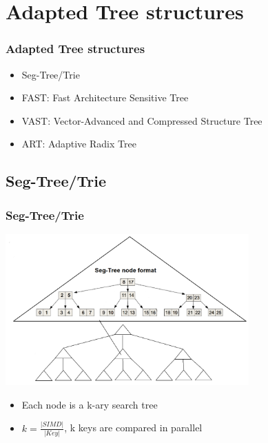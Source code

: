 \documentclass{beamer}
\begin{document}
\section{Adapted Tree structures}

\begin{frame}
\frametitle{Adapted Tree structures}
\begin{itemize}
	\item Seg-Tree/Trie
	\item FAST: Fast Architecture Sensitive Tree
	\item VAST: Vector-Advanced and Compressed Structure Tree
	\item ART: Adaptive Radix Tree
\end{itemize}
\end{frame}

\subsection{Seg-Tree/Trie}
\begin{frame}
\frametitle{Seg-Tree/Trie}
\begin{center}
	\includegraphics[width=0.7\textwidth]{img/seg_tree2.png}
\end{center}
\begin{itemize}
	\item Each node is a k-ary search tree
	\item $k = \frac{\vert SIMD \vert }{\vert Key \vert}$, k keys are compared in parallel
\end{itemize}
\end{frame}
\end{document}

